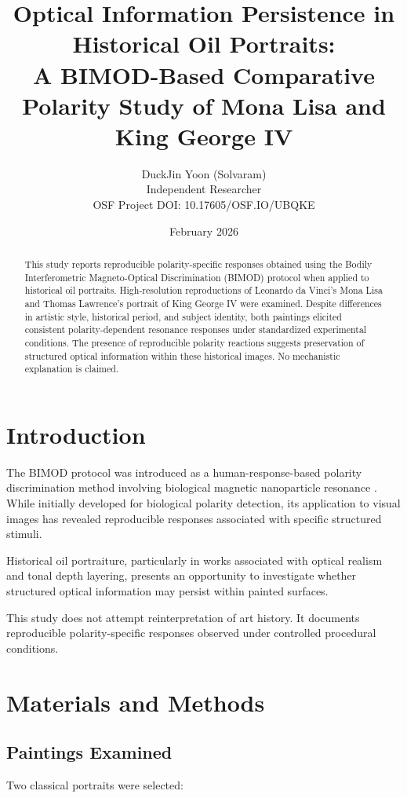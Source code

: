 \documentclass[12pt]{article}
\title{
Optical Information Persistence in Historical Oil Portraits:\\
A BIMOD-Based Comparative Polarity Study of Mona Lisa and King George IV
}
\author{
DuckJin Yoon (Solvaram)\\
Independent Researcher\\
OSF Project DOI: 10.17605/OSF.IO/UBQKE
}
\date{February 2026}
\begin{document}
\maketitle

\begin{abstract}
This study reports reproducible polarity-specific responses obtained using the Bodily Interferometric Magneto-Optical Discrimination (BIMOD) protocol when applied to historical oil portraits. High-resolution reproductions of Leonardo da Vinci’s Mona Lisa and Thomas Lawrence’s portrait of King George IV were examined. Despite differences in artistic style, historical period, and subject identity, both paintings elicited consistent polarity-dependent resonance responses under standardized experimental conditions. The presence of reproducible polarity reactions suggests preservation of structured optical information within these historical images. No mechanistic explanation is claimed.
\end{abstract}

\section{Introduction}

The BIMOD protocol was introduced as a human-response-based polarity discrimination method involving biological magnetic nanoparticle resonance \cite{Yoon2026BIMOD}. While initially developed for biological polarity detection, its application to visual images has revealed reproducible responses associated with specific structured stimuli.

Historical oil portraiture, particularly in works associated with optical realism and tonal depth layering, presents an opportunity to investigate whether structured optical information may persist within painted surfaces.

This study does not attempt reinterpretation of art history. It documents reproducible polarity-specific responses observed under controlled procedural conditions.

\section{Materials and Methods}

\subsection{Paintings Examined}

Two classical portraits were selected:
\end{document}
